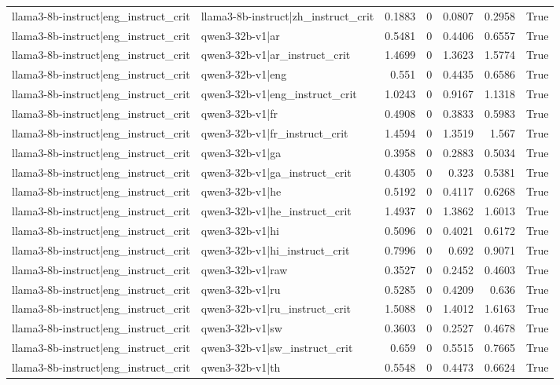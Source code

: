 \begin{table}
\begin{tabular}{l l r r r r l}
llama3-8b-instruct|eng_instruct_crit & llama3-8b-instruct|zh_instruct_crit & 0.1883 & 0 & 0.0807 & 0.2958 & True \\
llama3-8b-instruct|eng_instruct_crit & qwen3-32b-v1|ar & 0.5481 & 0 & 0.4406 & 0.6557 & True \\
llama3-8b-instruct|eng_instruct_crit & qwen3-32b-v1|ar_instruct_crit & 1.4699 & 0 & 1.3623 & 1.5774 & True \\
llama3-8b-instruct|eng_instruct_crit & qwen3-32b-v1|eng & 0.551 & 0 & 0.4435 & 0.6586 & True \\
llama3-8b-instruct|eng_instruct_crit & qwen3-32b-v1|eng_instruct_crit & 1.0243 & 0 & 0.9167 & 1.1318 & True \\
llama3-8b-instruct|eng_instruct_crit & qwen3-32b-v1|fr & 0.4908 & 0 & 0.3833 & 0.5983 & True \\
llama3-8b-instruct|eng_instruct_crit & qwen3-32b-v1|fr_instruct_crit & 1.4594 & 0 & 1.3519 & 1.567 & True \\
llama3-8b-instruct|eng_instruct_crit & qwen3-32b-v1|ga & 0.3958 & 0 & 0.2883 & 0.5034 & True \\
llama3-8b-instruct|eng_instruct_crit & qwen3-32b-v1|ga_instruct_crit & 0.4305 & 0 & 0.323 & 0.5381 & True \\
llama3-8b-instruct|eng_instruct_crit & qwen3-32b-v1|he & 0.5192 & 0 & 0.4117 & 0.6268 & True \\
llama3-8b-instruct|eng_instruct_crit & qwen3-32b-v1|he_instruct_crit & 1.4937 & 0 & 1.3862 & 1.6013 & True \\
llama3-8b-instruct|eng_instruct_crit & qwen3-32b-v1|hi & 0.5096 & 0 & 0.4021 & 0.6172 & True \\
llama3-8b-instruct|eng_instruct_crit & qwen3-32b-v1|hi_instruct_crit & 0.7996 & 0 & 0.692 & 0.9071 & True \\
llama3-8b-instruct|eng_instruct_crit & qwen3-32b-v1|raw & 0.3527 & 0 & 0.2452 & 0.4603 & True \\
llama3-8b-instruct|eng_instruct_crit & qwen3-32b-v1|ru & 0.5285 & 0 & 0.4209 & 0.636 & True \\
llama3-8b-instruct|eng_instruct_crit & qwen3-32b-v1|ru_instruct_crit & 1.5088 & 0 & 1.4012 & 1.6163 & True \\
llama3-8b-instruct|eng_instruct_crit & qwen3-32b-v1|sw & 0.3603 & 0 & 0.2527 & 0.4678 & True \\
llama3-8b-instruct|eng_instruct_crit & qwen3-32b-v1|sw_instruct_crit & 0.659 & 0 & 0.5515 & 0.7665 & True \\
llama3-8b-instruct|eng_instruct_crit & qwen3-32b-v1|th & 0.5548 & 0 & 0.4473 & 0.6624 & True \\

\end{tabular}
\end{table}
